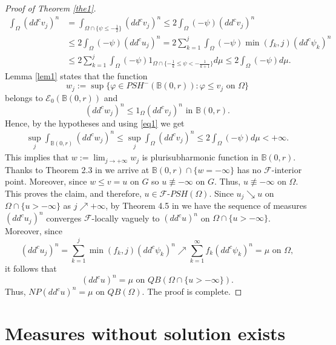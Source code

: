 \documentclass[3p,times]{elsarticle}
\numberwithin{equation}{section}
\newtheorem{The main theorem}[theorem]{The main theorem}
\theoremstyle{definition}
\begin{document}
\begin{proof}[Proof of Theorem \ref{the1}]
\begin{equation} \label{eq1}
\begin{split}
\int_\Omega (dd^c v_j)^n 
& =\int_{\Omega \cap \{ \psi \leq - \frac{1}{2}\} } (dd^c v_j)^n 
\leq 2 \int_{\Omega } (- \psi )(dd^c v_j)^n 
\\& \leq 2 \int_{\Omega } (- \psi )(dd^c u_j)^n 
 = 2 \sum_{k=1}^j  \int_{\Omega } (- \psi ) \min (f_k, j) (dd^c \psi_k)^n
\\ & \leq  2 \sum_{k=1}^j  \int_{\Omega } (- \psi )  1_{\Omega \cap \{ -\frac{1}{k} \leq \psi < - \frac{1}{k+1} \}} d \mu  
\leq 2 \int_\Omega (-\psi) d\mu.
\end{split}
\end{equation}
Lemma \ref{lem1} states that the function 
$$
w_j:=\sup\{ \varphi \in PSH^-(\mathbb B(0,r)): \varphi \leq v_j \text{ on } \Omega\}
$$
belongs to  $  \mathcal E_0(\mathbb B(0,r))$ and 
$$(dd^c w_j)^n \leq 1_\Omega (dd^c v_j)^n \text{ in } \mathbb B(0,r).$$  
Hence, by the hypotheses and using \eqref{eq1}  we get 
\begin{align*}
\sup_j \int_{\mathbb B(0,r)} (dd^c w_j)^n 
\leq \sup_j \int_{\Omega} (dd^c v_j)^n 
\leq   2 \int_\Omega (-\psi) d\mu <+\infty.
\end{align*}
This implies that 
$w:=\lim_{j\to+\infty} w_j$ is plurisubharmonic function in $ \mathbb B(0,r) $.   
Thanks to Theorem 2.3 in  \cite{KFW11} we arrive at 
$\mathbb B(0,r) \cap \{ w=-\infty\}$ has no $\mathcal F$-interior point. Moreover, since $w\leq v =u $ on $G$
so $u\not \equiv -\infty$ on $G$. Thus, $u\not \equiv -\infty$ on $\Omega$. 
This proves the claim, and therefore, $u \in \mathcal F \text{-} PSH(\Omega)$.
Since $u_j \searrow u$ on $\Omega \cap \{u>-\infty\}$ as $j\nearrow +\infty$, by Theorem 4.5 in \cite{KS14}  we have  the sequence of measures $(dd^c u_j)^n$ converges $\mathcal F$-locally vaguely to $(dd^c u)^n$ on $\Omega \cap \{u>-\infty\}$.
Moreover, since 
$$
(dd^c u_j)^n =\sum_{k=1}^j \min (f_k, j) (dd^c \psi_k)^n \nearrow   \sum_{k=1}^\infty  f_k  (dd^c \psi_k)^n  =\mu \text{ on } \Omega  ,
$$
it follows that 
$$
(dd^c u)^n = \mu \text{ on } QB(\Omega \cap \{u>-\infty\} ) .
$$
Thus, 
$
NP(dd^c u)^n = \mu \text{ on } QB(\Omega) .
$
The proof is complete.
\end{proof}






\section{Measures without   solution  exists}
\end{document}
